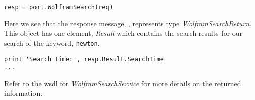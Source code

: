 \begin{verbatim}
resp = port.WolframSearch(req)
\end{verbatim}

Here we see that the response message, , represents type {\it WolframSearchReturn}.
This object has one element, {\it Result} which contains the search results for our
search of the keyword, {\tt newton}.

\begin{verbatim}
print 'Search Time:', resp.Result.SearchTime
...
\end{verbatim}

Refer to the wsdl for {\it WolframSearchService} for more details on the returned information.